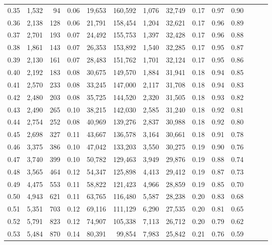 \begin{tabular}{rrrrrrrrrrrrrr}
0.35 &  1,532 &     94 &  0.06 &   19,653 &  160,592 &   1,076 &  32,749 &  0.17 &  0.97 &      0.90 \\
0.36 &  2,138 &    128 &  0.06 &   21,791 &  158,454 &   1,204 &  32,621 &  0.17 &  0.96 &      0.89 \\
0.37 &  2,701 &    193 &  0.07 &   24,492 &  155,753 &   1,397 &  32,428 &  0.17 &  0.96 &      0.88 \\
0.38 &  1,861 &    143 &  0.07 &   26,353 &  153,892 &   1,540 &  32,285 &  0.17 &  0.95 &      0.87 \\
0.39 &  2,130 &    161 &  0.07 &   28,483 &  151,762 &   1,701 &  32,124 &  0.17 &  0.95 &      0.86 \\
0.40 &  2,192 &    183 &  0.08 &   30,675 &  149,570 &   1,884 &  31,941 &  0.18 &  0.94 &      0.85 \\
0.41 &  2,570 &    233 &  0.08 &   33,245 &  147,000 &   2,117 &  31,708 &  0.18 &  0.94 &      0.83 \\
0.42 &  2,480 &    203 &  0.08 &   35,725 &  144,520 &   2,320 &  31,505 &  0.18 &  0.93 &      0.82 \\
0.43 &  2,490 &    265 &  0.10 &   38,215 &  142,030 &   2,585 &  31,240 &  0.18 &  0.92 &      0.81 \\
0.44 &  2,754 &    252 &  0.08 &   40,969 &  139,276 &   2,837 &  30,988 &  0.18 &  0.92 &      0.80 \\
0.45 &  2,698 &    327 &  0.11 &   43,667 &  136,578 &   3,164 &  30,661 &  0.18 &  0.91 &      0.78 \\
0.46 &  3,375 &    386 &  0.10 &   47,042 &  133,203 &   3,550 &  30,275 &  0.19 &  0.90 &      0.76 \\
0.47 &  3,740 &    399 &  0.10 &   50,782 &  129,463 &   3,949 &  29,876 &  0.19 &  0.88 &      0.74 \\
0.48 &  3,565 &    464 &  0.12 &   54,347 &  125,898 &   4,413 &  29,412 &  0.19 &  0.87 &      0.73 \\
0.49 &  4,475 &    553 &  0.11 &   58,822 &  121,423 &   4,966 &  28,859 &  0.19 &  0.85 &      0.70 \\
0.50 &  4,943 &    621 &  0.11 &   63,765 &  116,480 &   5,587 &  28,238 &  0.20 &  0.83 &      0.68 \\
0.51 &  5,351 &    703 &  0.12 &   69,116 &  111,129 &   6,290 &  27,535 &  0.20 &  0.81 &      0.65 \\
0.52 &  5,791 &    823 &  0.12 &   74,907 &  105,338 &   7,113 &  26,712 &  0.20 &  0.79 &      0.62 \\
0.53 &  5,484 &    870 &  0.14 &   80,391 &   99,854 &   7,983 &  25,842 &  0.21 &  0.76 &      0.59 \\

\end{tabular}
